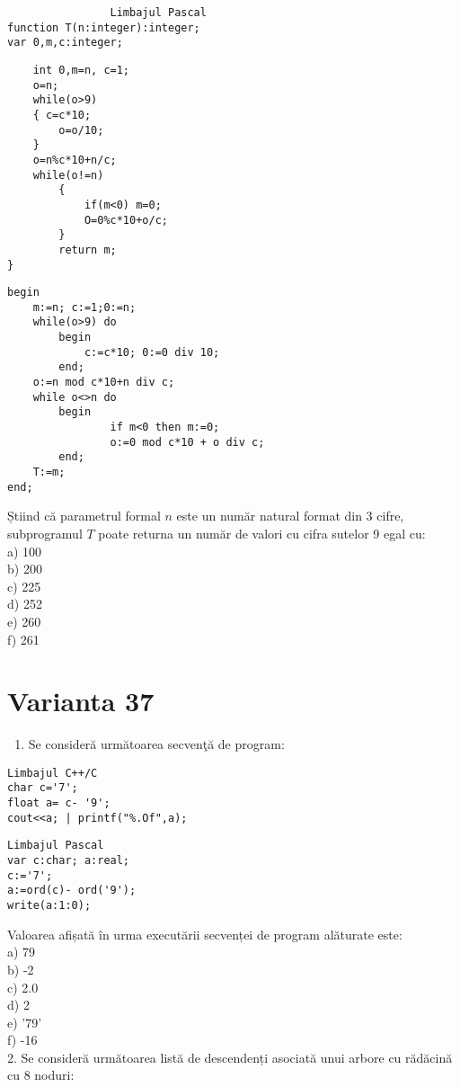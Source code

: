\begin{verbatim}
                Limbajul Pascal
function T(n:integer):integer;
var 0,m,c:integer;
\end{verbatim}

\begin{verbatim}
    int 0,m=n, c=1;
    o=n;
    while(o>9)
    { c=c*10;
        o=o/10;
    }
    o=n%c*10+n/c;
    while(o!=n)
        {
            if(m<0) m=0;
            O=0%c*10+o/c;
        }
        return m;
}
\end{verbatim}

\begin{verbatim}
begin
    m:=n; c:=1;0:=n;
    while(o>9) do
        begin
            c:=c*10; 0:=0 div 10;
        end;
    o:=n mod c*10+n div c;
    while o<>n do
        begin
                if m<0 then m:=0;
                o:=0 mod c*10 + o div c;
        end;
    T:=m;
end;
\end{verbatim}

Știind că parametrul formal $n$ este un număr natural format din 3 cifre, subprogramul $T$ poate returna un număr de valori cu cifra sutelor 9 egal cu:\\
a) 100\\
b) 200\\
c) 225\\
d) 252\\
e) 260\\
f) 261

\section*{Varianta 37}
\begin{enumerate}
  \item Se consideră următoarea secvenţă de program:
\end{enumerate}

\begin{verbatim}
Limbajul C++/C
char c='7';
float a= c- '9';
cout<<a; | printf("%.Of",a);
\end{verbatim}

\begin{verbatim}
Limbajul Pascal
var c:char; a:real;
c:='7';
a:=ord(c)- ord('9');
write(a:1:0);
\end{verbatim}

Valoarea afișată în urma executării secvenței de program alăturate este:\\
a) 79\\
b) -2\\
c) 2.0\\
d) 2\\
e) '79'\\
f) -16\\
2. Se consideră următoarea listă de descendenți asociată unui arbore cu rădăcină cu 8 noduri:

